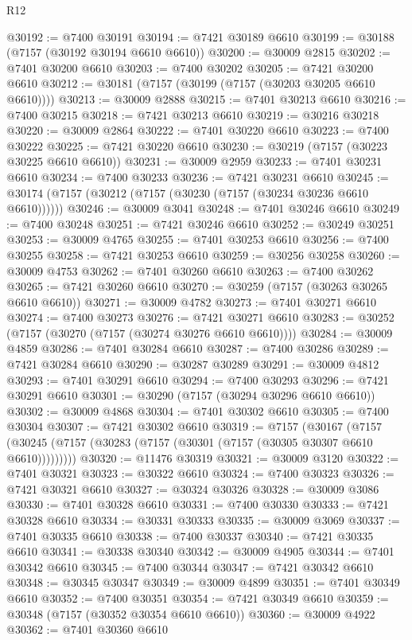 \begin{lexlean}{R12}
\begin{coremodule}
@30192 := @7400 @30191
@30194 := @7421 @30189 @6610
@30199 := @30188 (@7157 (@30192 @30194 @6610 @6610))
@30200 := @30009 @2815
@30202 := @7401 @30200 @6610
@30203 := @7400 @30202
@30205 := @7421 @30200 @6610
@30212 := @30181 (@7157 (@30199 (@7157 (@30203 @30205 @6610 @6610))))
@30213 := @30009 @2888
@30215 := @7401 @30213 @6610
@30216 := @7400 @30215
@30218 := @7421 @30213 @6610
@30219 := @30216 @30218
@30220 := @30009 @2864
@30222 := @7401 @30220 @6610
@30223 := @7400 @30222
@30225 := @7421 @30220 @6610
@30230 := @30219 (@7157 (@30223 @30225 @6610 @6610))
@30231 := @30009 @2959
@30233 := @7401 @30231 @6610
@30234 := @7400 @30233
@30236 := @7421 @30231 @6610
@30245 := @30174 (@7157 (@30212 (@7157 (@30230 (@7157 (@30234 @30236 @6610 @6610))))))
@30246 := @30009 @3041
@30248 := @7401 @30246 @6610
@30249 := @7400 @30248
@30251 := @7421 @30246 @6610
@30252 := @30249 @30251
@30253 := @30009 @4765
@30255 := @7401 @30253 @6610
@30256 := @7400 @30255
@30258 := @7421 @30253 @6610
@30259 := @30256 @30258
@30260 := @30009 @4753
@30262 := @7401 @30260 @6610
@30263 := @7400 @30262
@30265 := @7421 @30260 @6610
@30270 := @30259 (@7157 (@30263 @30265 @6610 @6610))
@30271 := @30009 @4782
@30273 := @7401 @30271 @6610
@30274 := @7400 @30273
@30276 := @7421 @30271 @6610
@30283 := @30252 (@7157 (@30270 (@7157 (@30274 @30276 @6610 @6610))))
@30284 := @30009 @4859
@30286 := @7401 @30284 @6610
@30287 := @7400 @30286
@30289 := @7421 @30284 @6610
@30290 := @30287 @30289
@30291 := @30009 @4812
@30293 := @7401 @30291 @6610
@30294 := @7400 @30293
@30296 := @7421 @30291 @6610
@30301 := @30290 (@7157 (@30294 @30296 @6610 @6610))
@30302 := @30009 @4868
@30304 := @7401 @30302 @6610
@30305 := @7400 @30304
@30307 := @7421 @30302 @6610
@30319 := @7157
    (@30167 (@7157 (@30245 (@7157 (@30283 (@7157 (@30301 (@7157 (@30305 @30307 @6610 @6610)))))))))
@30320 := @11476 @30319
@30321 := @30009 @3120
@30322 := @7401 @30321
@30323 := @30322 @6610
@30324 := @7400 @30323
@30326 := @7421 @30321 @6610
@30327 := @30324 @30326
@30328 := @30009 @3086
@30330 := @7401 @30328 @6610
@30331 := @7400 @30330
@30333 := @7421 @30328 @6610
@30334 := @30331 @30333
@30335 := @30009 @3069
@30337 := @7401 @30335 @6610
@30338 := @7400 @30337
@30340 := @7421 @30335 @6610
@30341 := @30338 @30340
@30342 := @30009 @4905
@30344 := @7401 @30342 @6610
@30345 := @7400 @30344
@30347 := @7421 @30342 @6610
@30348 := @30345 @30347
@30349 := @30009 @4899
@30351 := @7401 @30349 @6610
@30352 := @7400 @30351
@30354 := @7421 @30349 @6610
@30359 := @30348 (@7157 (@30352 @30354 @6610 @6610))
@30360 := @30009 @4922
@30362 := @7401 @30360 @6610

\end{coremodule}
\end{lexlean}
